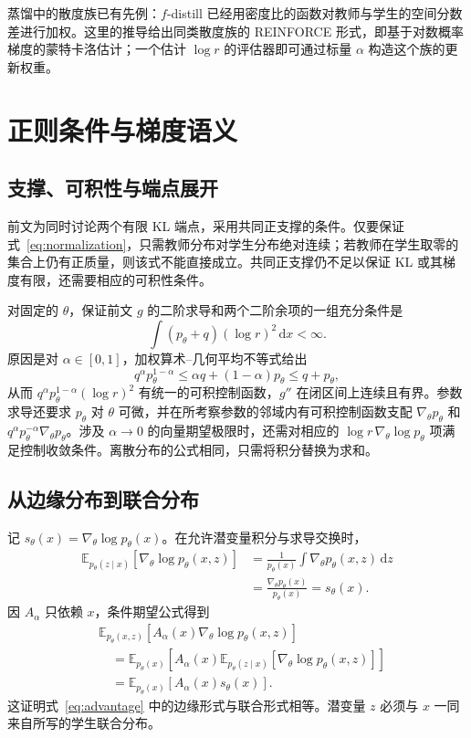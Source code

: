 \documentclass[UTF8,fontset=none,11pt,a4paper]{ctexart}
\newcommand{\E}{\mathbb E}
\newcommand{\dd}{\,\mathrm d}
\begin{document}
蒸馏中的散度族已有先例：$f$-distill 已经用密度比的函数对教师与学生的空间分数差进行加权。这里的推导给出同类散度族的 REINFORCE 形式，即基于对数概率梯度的蒙特卡洛估计；一个估计 $\log r$ 的评估器即可通过标量 $\alpha$ 构造这个族的更新权重。

\appendix
\section{正则条件与梯度语义}

\subsection{支撑、可积性与端点展开}
前文为同时讨论两个有限 KL 端点，采用共同正支撑的条件。仅要保证式~\eqref{eq:normalization}，只需教师分布对学生分布绝对连续；若教师在学生取零的集合上仍有正质量，则该式不能直接成立。共同正支撑仍不足以保证 KL 或其梯度有限，还需要相应的可积性条件。

对固定的 $\theta$，保证前文 $g$ 的二阶求导和两个二阶余项的一组充分条件是
\[
\int (p_\theta+q)(\log r)^2\dd x<\infty.
\]
原因是对 $\alpha\in[0,1]$，加权算术--几何平均不等式给出
\[
q^\alpha p_\theta^{1-\alpha}
\leq\alpha q+(1-\alpha)p_\theta
\leq q+p_\theta,
\]
从而 $q^\alpha p_\theta^{1-\alpha}(\log r)^2$ 有统一的可积控制函数，$g''$ 在闭区间上连续且有界。参数求导还要求 $p_\theta$ 对 $\theta$ 可微，并在所考察参数的邻域内有可积控制函数支配 $\nabla_\theta p_\theta$ 和 $q^\alpha p_\theta^{-\alpha}\nabla_\theta p_\theta$。涉及 $\alpha\to0$ 的向量期望极限时，还需对相应的 $\log r\,\nabla_\theta\log p_\theta$ 项满足控制收敛条件。离散分布的公式相同，只需将积分替换为求和。

\subsection{从边缘分布到联合分布}
记 $s_\theta(x)=\nabla_\theta\log p_\theta(x)$。在允许潜变量积分与求导交换时，
\[
\begin{aligned}
\E_{p_\theta(z\mid x)}[\nabla_\theta\log p_\theta(x,z)]
&=\frac1{p_\theta(x)}\int\nabla_\theta p_\theta(x,z)\dd z\\
&=\frac{\nabla_\theta p_\theta(x)}{p_\theta(x)}
=s_\theta(x).
\end{aligned}
\]
因 $A_\alpha$ 只依赖 $x$，条件期望公式得到
\[
\begin{aligned}
&\E_{p_\theta(x,z)}[A_\alpha(x)\nabla_\theta\log p_\theta(x,z)]\\
&\quad=\E_{p_\theta(x)}\!
\left[A_\alpha(x)\E_{p_\theta(z\mid x)}[\nabla_\theta\log p_\theta(x,z)]\right]\\
&\quad=\E_{p_\theta(x)}[A_\alpha(x)s_\theta(x)].
\end{aligned}
\]
这证明式~\eqref{eq:advantage} 中的边缘形式与联合形式相等。潜变量 $z$ 必须与 $x$ 一同来自所写的学生联合分布。
\end{document}

